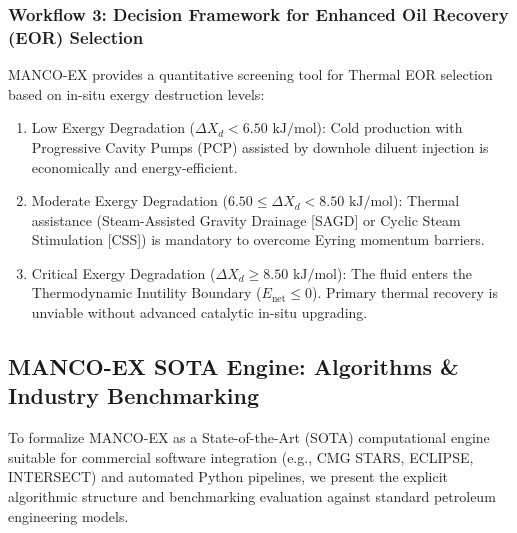 \documentclass[review,12pt]{elsarticle}
\begin{document}
\subsubsection{Workflow 3: Decision Framework for Enhanced Oil Recovery (EOR) Selection}
MANCO-EX provides a quantitative screening tool for Thermal EOR selection based on in-situ exergy destruction levels:
\begin{enumerate}
    \item Low Exergy Degradation ($\Delta X_d < 6.50\text{ kJ/mol}$): Cold production with Progressive Cavity Pumps (PCP) assisted by downhole diluent injection is economically and energy-efficient.
    \item Moderate Exergy Degradation ($6.50 \le \Delta X_d < 8.50\text{ kJ/mol}$): Thermal assistance (Steam-Assisted Gravity Drainage [SAGD] or Cyclic Steam Stimulation [CSS]) is mandatory to overcome Eyring momentum barriers.
    \item Critical Exergy Degradation ($\Delta X_d \ge 8.50\text{ kJ/mol}$): The fluid enters the Thermodynamic Inutility Boundary ($E_{\text{net}} \le 0$). Primary thermal recovery is unviable without advanced catalytic in-situ upgrading.
\end{enumerate}

\subsection{MANCO-EX SOTA Engine: Algorithms \& Industry Benchmarking}
To formalize MANCO-EX as a State-of-the-Art (SOTA) computational engine suitable for commercial software integration (e.g., CMG STARS, ECLIPSE, INTERSECT) and automated Python pipelines, we present the explicit algorithmic structure and benchmarking evaluation against standard petroleum engineering models.
\end{document}
